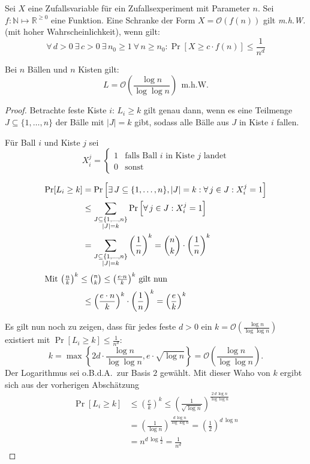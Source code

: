 \begin{defn}
	Sei $X$ eine Zufallsvariable für ein Zufallsexperiment mit Parameter
	$n$. Sei $f : \mathbb{N} \mapsto \mathbb{R}^{\geq 0}$ eine Funktion.
	Eine Schranke der Form $X = \mathcal{O}\left(f(n)\right)$ gilt
	\emph{m.h.W.} (mit hoher Wahrscheinlichkeit), wenn gilt:
	\[ \forall\,d > 0 \ \exists\,c > 0 \ \exists\,n_0 \geq 1 \ \forall\,n
	\geq n_0 : \Pr\left[ X \geq c \cdot f(n)\right] \leq \frac{1}{n^d} \]
\end{defn}
\begin{satz}
	Bei $n$ Bällen und $n$ Kisten gilt:
	\[ L = \mathcal{O}\left(\frac{\log n}{\log \log n}\right) \ \
	\text{m.h.W.} \]
\end{satz}
\begin{proof}
	Betrachte feste Kiste $i$: $L_i \geq k$ gilt genau dann, wenn es eine
	Teilmenge $J \subseteq \{1, \dots, n \}$ der Bälle mit $|J| = k$ gibt,
	sodass alle Bälle aus $J$ in Kiste $i$ fallen.

	Für Ball $i$ und Kiste $j$ sei
	\[
	  X_i^j = \begin{cases} 1 & \text{falls Ball $i$ in Kiste $j$ landet}\\
		  0 & \text{sonst} \end{cases}
	\]

	\begin{align*}
	  \Pr[L_i \geq k] &= \Pr\left[ \exists\,J \subseteq \{1, \dots, n\}, |J| =
	  k : \forall\,j \in J : X_i^j = 1 \right] \\
	  &\leq \sum_{\substack{J\subseteq\{1,\dots,n\}\\|J|=k}}
	  \Pr\left[\forall\,j \in J : X_i^j = 1\right] \\
	  &= \sum_{\substack{J\subseteq\{1,\dots,n\}\\|J|=k}}
	  \left(\frac{1}{n}\right)^k = \binom{n}{k} \cdot \left(\frac{1}{n}\right)^k \\
	  \intertext{Mit $\left(\frac{n}{k}\right)^k \leq \binom{n}{k} \leq
	  \left(\frac{e\cdot n}{k}\right)^k$ gilt nun}
	  &\leq \left( \frac{e\cdot n}{k} \right)^k \cdot \left( \frac{1}{n}
	  \right)^k = \left( \frac{e}{k} \right)^k
	\end{align*}

	Es gilt nun noch zu zeigen, dass für jedes feste $d > 0$ ein $k =
	\mathcal{O}\left(\frac{\log n}{\log \log n}\right)$ existiert mit
	$\Pr[L_i \geq k] \leq \frac{1}{n^d}$:
	\[
	  k = \max \left\{ 2 d \cdot \frac{\log n}{\log \log n}, e \cdot
	  \sqrt{\log n} \right\} = \mathcal{O}\left(\frac{\log n}{\log \log
	  n}\right).
	\]
	Der Logarithmus sei o.B.d.A.\ zur Basis $2$ gewählt. Mit dieser Waho
	von $k$ ergibt sich aus der vorherigen Abschätzung
	\begin{align*}
		\Pr[L_i \geq k] &\leq \left(\frac{e}{k}\right)^k \leq \left(
		\frac{1}{\sqrt{\log n}} \right)^{\frac{2\,d\,\log n}{\log \log
		n}} \\
		&= \left( \frac{1}{\log n} \right)^{\frac{d\,\log
		n}{\log \log n}} = \left(\frac{1}{2}\right)^{d\,\log n} \\
		&= n^{d\,\log \frac{1}{2}} = \frac{1}{n^d}
	\end{align*}
	

\end{proof}

